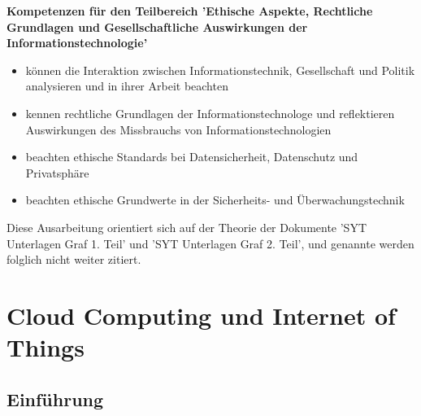 \documentclass[letterpaper, 12pt]{article}
\let\tempsection\section
\renewcommand\section[1]{\vspace{-0.3cm}\tempsection{#1}\vspace{-0.3cm}}
\let\tempsubsection\subsection
\renewcommand\subsection[1]{\vspace{0cm}\tempsubsection{#1}\vspace{0cm}}
\begin{document}
\parindent 0pt
\parskip 6pt



\clearpage
\thispagestyle{empty}
\tableofcontents

\newpage
{}
\pagestyle{fancy}

\textbf{Kompetenzen für den Teilbereich 'Ethische Aspekte, Rechtliche Grundlagen und Gesellschaftliche Auswirkungen der Informationstechnologie'} \newline
\begin{itemize}
	\item können die Interaktion zwischen Informationstechnik, Gesellschaft und Politik analysieren und in ihrer Arbeit beachten
	\item kennen rechtliche Grundlagen der Informationstechnologe und reflektieren Auswirkungen des Missbrauchs von Informationstechnologien
	\item beachten ethische Standards bei Datensicherheit, Datenschutz und Privatsphäre
	\item beachten ethische Grundwerte in der Sicherheits- und Überwachungstechnik
\end{itemize}

\clearpage

Diese Ausarbeitung orientiert sich auf der Theorie der Dokumente 'SYT Unterlagen Graf 1. Teil' und 'SYT Unterlagen Graf 2. Teil', und genannte werden folglich nicht weiter zitiert.

\section{Cloud Computing und Internet of Things}

\subsection{Einführung}
\end{document}
